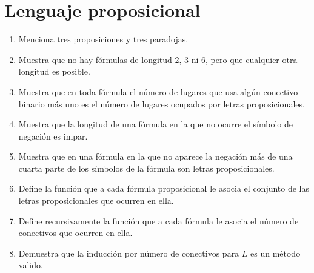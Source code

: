 \documentclass[letterpaper,DIV=15,headsepline,12pt]{scrartcl}
\begin{document}
    \section*{Lenguaje proposicional}
        \begin{enumerate}
            \item Menciona tres proposiciones y tres paradojas.
            \item Muestra que no hay fórmulas de longitud 2, 3 ni 6, pero que cualquier otra longitud es posible.
            \item Muestra que en toda fórmula el número de lugares que usa algún conectivo binario más uno es el número de lugares ocupados por letras proposicionales.
            \item Muestra que la longitud de una fórmula en la que no ocurre el símbolo de negación es impar.
            \item Muestra que en una fórmula en la que no aparece la negación más de una cuarta parte de los símbolos de la fórmula son letras proposicionales.
            \item Define la función que a cada fórmula proposicional le asocia el conjunto de las letras proposicionales que ocurren en ella.
            \item Define recursivamente la función que a cada fórmula le asocia el número de conectivos que ocurren en ella.
            \item Demuestra que la inducción por número de conectivos para $\overline{L}$ es un método valido.
        \end{enumerate}
    
    \newpage
\end{document}
